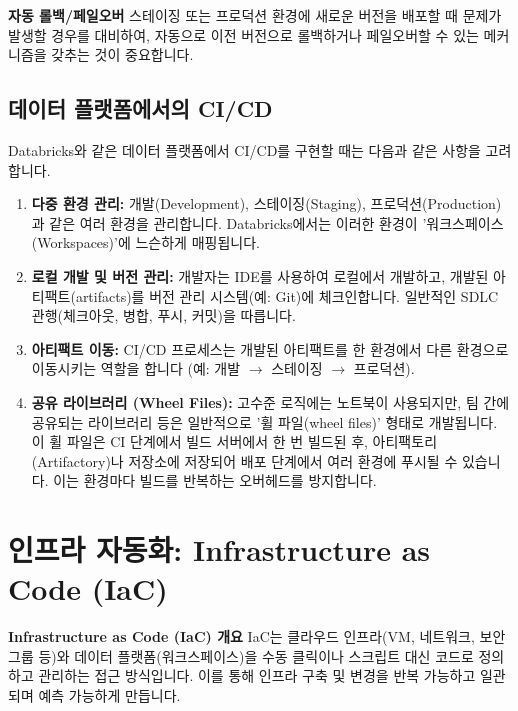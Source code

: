 \documentclass[11pt,a4paper]{article}
\theoremstyle{definition}
\begin{document}
\begin{warningbox} %
\textbf{자동 롤백/페일오버}
스테이징 또는 프로덕션 환경에 새로운 버전을 배포할 때 문제가 발생할 경우를 대비하여, 자동으로 이전 버전으로 롤백하거나 페일오버할 수 있는 메커니즘을 갖추는 것이 중요합니다.
\end{warningbox}

\subsection{데이터 플랫폼에서의 CI/CD}
Databricks와 같은 데이터 플랫폼에서 CI/CD를 구현할 때는 다음과 같은 사항을 고려합니다.

\begin{enumerate}
    \item \textbf{다중 환경 관리:}
    개발(Development), 스테이징(Staging), 프로덕션(Production)과 같은 여러 환경을 관리합니다. Databricks에서는 이러한 환경이 '워크스페이스(Workspaces)'에 느슨하게 매핑됩니다.

    \item \textbf{로컬 개발 및 버전 관리:}
    개발자는 IDE를 사용하여 로컬에서 개발하고, 개발된 아티팩트(artifacts)를 버전 관리 시스템(예: Git)에 체크인합니다. 일반적인 SDLC 관행(체크아웃, 병합, 푸시, 커밋)을 따릅니다.

    \item \textbf{아티팩트 이동:}
    CI/CD 프로세스는 개발된 아티팩트를 한 환경에서 다른 환경으로 이동시키는 역할을 합니다 (예: 개발 $\rightarrow$ 스테이징 $\rightarrow$ 프로덕션).

    \item \textbf{공유 라이브러리 (Wheel Files):}
    고수준 로직에는 노트북이 사용되지만, 팀 간에 공유되는 라이브러리 등은 일반적으로 '휠 파일(wheel files)' 형태로 개발됩니다. 이 휠 파일은 CI 단계에서 빌드 서버에서 한 번 빌드된 후, 아티팩토리(Artifactory)나 저장소에 저장되어 배포 단계에서 여러 환경에 푸시될 수 있습니다. 이는 환경마다 빌드를 반복하는 오버헤드를 방지합니다.
\end{enumerate}

\newpage
\section{인프라 자동화: Infrastructure as Code (IaC)}

\begin{tcolorbox}[conceptbox] %
\textbf{Infrastructure as Code (IaC) 개요}
IaC는 클라우드 인프라(VM, 네트워크, 보안 그룹 등)와 데이터 플랫폼(워크스페이스)을 수동 클릭이나 스크립트 대신 코드로 정의하고 관리하는 접근 방식입니다. 이를 통해 인프라 구축 및 변경을 반복 가능하고 일관되며 예측 가능하게 만듭니다.
\end{tcolorbox}
\end{document}
